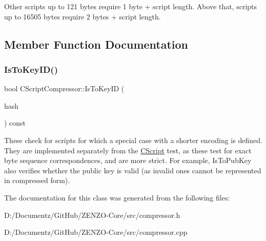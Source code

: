 Other scripts up to 121 bytes require 1 byte + script length. Above that, scripts up to 16505 bytes require 2 bytes + script length. 

\subsection{Member Function Documentation}
\mbox{\label{class_c_script_compressor_a38e2dcfce62bb157b55536d73748f556}} 
\subsubsection{\texorpdfstring{IsToKeyID()}{IsToKeyID()}}
{\footnotesize\ttfamily bool C\+Script\+Compressor\+::\+Is\+To\+Key\+ID (\begin{DoxyParamCaption}\item[{\mbox{\hyperlink{class_c_key_i_d}{C\+Key\+ID}} \&}]{hash }\end{DoxyParamCaption}) const\hspace{0.3cm}{\ttfamily [protected]}}

These check for scripts for which a special case with a shorter encoding is defined. They are implemented separately from the \mbox{\hyperlink{class_c_script}{C\+Script}} test, as these test for exact byte sequence correspondences, and are more strict. For example, Is\+To\+Pub\+Key also verifies whether the public key is valid (as invalid ones cannot be represented in compressed form). 

The documentation for this class was generated from the following files\+:\begin{DoxyCompactItemize}
\item 
D\+:/\+Documentz/\+Git\+Hub/\+Z\+E\+N\+Z\+O-\/\+Core/src/compressor.\+h\item 
D\+:/\+Documentz/\+Git\+Hub/\+Z\+E\+N\+Z\+O-\/\+Core/src/compressor.\+cpp\end{DoxyCompactItemize}

